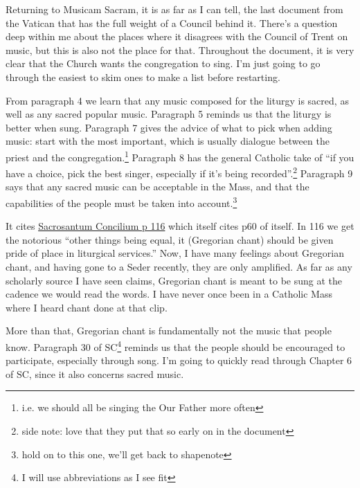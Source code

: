 \documentclass[12pt]{article}
\newcommand{\say}[1]{``#1''}
\renewcommand{\,}{\textsuperscript{,}}
\begin{document}
Returning to Musicam Sacram, it is as far as I can tell, the last document from the Vatican that has the full weight of a Council behind it.  
There's a question deep within me about the places where it disagrees with the Council of Trent on music, but this is also not the place for that.  
Throughout the document, it is very clear that the Church wants the congregation to sing.  
I'm just going to go through the easiest to skim ones to make a list before restarting.

From paragraph 4 we learn that any music composed for the liturgy is sacred, as well as any sacred popular music.  
Paragraph 5 reminds us that the liturgy is better when sung.  
Paragraph 7 gives the advice of what to pick when adding music: start with the most important, which is usually dialogue between the priest and the congregation.\footnote{i.e. we should all be singing the Our Father more often}  
Paragraph 8 has the general Catholic take of \say{if you have a choice, pick the best singer, especially if it's being recorded}.\footnote{side note: love that they put that so early on in the document}  
Paragraph 9 says that any sacred music can be acceptable in the Mass, and that the capabilities of the people must be taken into account.\footnote{hold on to this one, we'll get back to shapenote}

It cites \href{https://www.vatican.va/archive/hist\_councils/ii\_vatican\_council/documents/vat-ii\_const\_19631204\_sacrosanctum-concilium\_en.html}{Sacrosantum Concilium p 116} which itself cites p60 of itself.  
In 116 we get the notorious \say{other things being equal, it (Gregorian chant) should be given pride of place in liturgical services.}  
Now, I have many feelings about Gregorian chant, and having gone to a Seder recently, they are only amplified.  
As far as any scholarly source I have seen claims, Gregorian chant is meant to be sung at the cadence we would read the words.  
I have never once been in a Catholic Mass where I heard chant done at that clip.

More than that, Gregorian chant is fundamentally not the music that people know.  
Paragraph 30 of SC\footnote{I will use abbreviations as I see fit} reminds us that the people should be encouraged to participate, especially through song.  
I'm going to quickly read through Chapter 6 of SC, since it also concerns sacred music.
\end{document}
